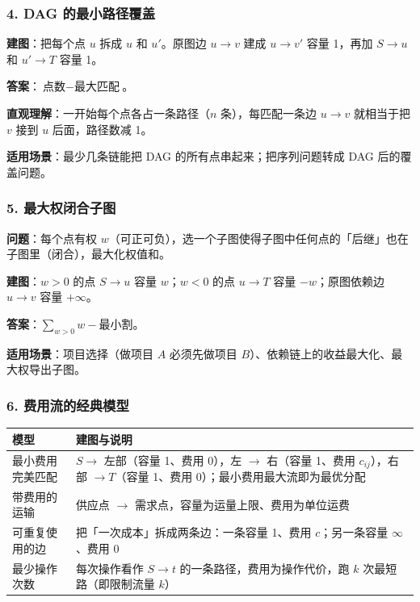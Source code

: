 \subsubsection*{4. DAG 的最小路径覆盖}

\textbf{建图}：把每个点 $u$ 拆成 $u$ 和 $u'$。原图边 $u\to v$ 建成 $u\to v'$ 容量 1，再加 $S\to u$ 和 $u'\to T$ 容量 1。

\textbf{答案}：$\text{点数} - \text{最大匹配}$。

\textbf{直观理解}：一开始每个点各占一条路径（$n$ 条），每匹配一条边 $u\to v$ 就相当于把 $v$ 接到 $u$ 后面，路径数减 1。

\textbf{适用场景}：最少几条链能把 DAG 的所有点串起来；把序列问题转成 DAG 后的覆盖问题。

\subsubsection*{5. 最大权闭合子图}

\textbf{问题}：每个点有权 $w$（可正可负），选一个子图使得子图中任何点的「后继」也在子图里（闭合），最大化权值和。

\textbf{建图}：$w>0$ 的点 $S\to u$ 容量 $w$；$w<0$ 的点 $u\to T$ 容量 $-w$；原图依赖边 $u\to v$ 容量 $+\infty$。

\textbf{答案}：$\displaystyle \sum_{w>0} w - \text{最小割}$。

\textbf{适用场景}：项目选择（做项目 $A$ 必须先做项目 $B$）、依赖链上的收益最大化、最大权导出子图。

\subsubsection*{6. 费用流的经典模型}

\begin{center}
\begin{tabular}{|p{5.4cm}|p{8.2cm}|}
\hline
\textbf{模型} & \textbf{建图与说明} \\
\hline
最小费用完美匹配 & $S\to$ 左部（容量 1、费用 0），左 $\to$ 右（容量 1、费用 $c_{ij}$），右部 $\to T$（容量 1、费用 0）；最小费用最大流即为最优分配 \\
\hline
带费用的运输 & 供应点 $\to$ 需求点，容量为运量上限、费用为单位运费 \\
\hline
可重复使用的边 & 把「一次成本」拆成两条边：一条容量 1、费用 $c$；另一条容量 $\infty$、费用 0 \\
\hline
最少操作次数 & 每次操作看作 $S\to t$ 的一条路径，费用为操作代价，跑 $k$ 次最短路（即限制流量 $k$）\\
\hline
\end{tabular}
\end{center}

